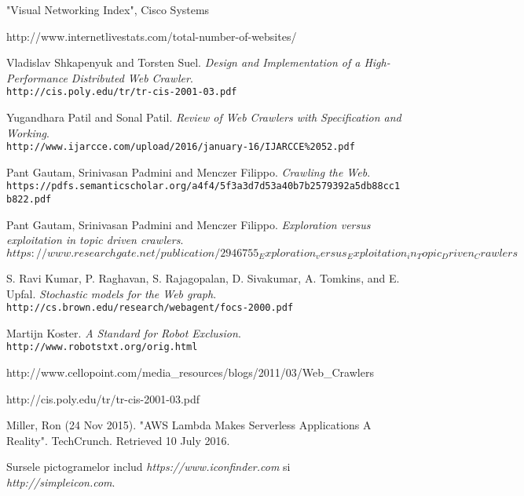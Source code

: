 \begin{thebibliography}{99}

"Visual Networking Index", Cisco Systems
  
http://www.internetlivestats.com/total-number-of-websites/

Vladislav Shkapenyuk and Torsten Suel.
\textit{Design and Implementation of a High-Performance Distributed Web Crawler}.\\
\texttt{http://cis.poly.edu/tr/tr-cis-2001-03.pdf}

Yugandhara Patil and Sonal Patil.
\textit{Review of Web Crawlers with Specification and Working}.\\
\texttt{http://www.ijarcce.com/upload/2016/january-16/IJARCCE\%2052.pdf}

Pant Gautam, Srinivasan Padmini and Menczer Filippo.
\textit{Crawling the Web}.\\
\texttt{https://pdfs.semanticscholar.org/a4f4/5f3a3d7d53a40b7b2579392a5db88cc1b822.pdf}

Pant Gautam, Srinivasan Padmini and Menczer Filippo.
\textit{Exploration versus exploitation in topic driven crawlers}.\\
\texttt{$https://www.researchgate.net/publication/2946755_Exploration_versus_Exploitation_in_Topic_Driven_Crawlers$}

S. Ravi Kumar, P. Raghavan, S. Rajagopalan, D. Sivakumar, A. Tomkins, and E. Upfal.
\textit{Stochastic models for the Web graph}.\\
\texttt{http://cs.brown.edu/research/webagent/focs-2000.pdf}

Martijn Koster.
\textit{A Standard for Robot Exclusion}.\\
\texttt{http://www.robotstxt.org/orig.html}
  
http://www.cellopoint.com/media\_resources/blogs/2011/03/Web\_Crawlers

http://cis.poly.edu/tr/tr-cis-2001-03.pdf

Miller, Ron (24 Nov 2015). "AWS Lambda Makes Serverless Applications A Reality". TechCrunch. Retrieved 10 July 2016.

Sursele pictogramelor includ \emph{https://www.iconfinder.com} si \emph{http://simpleicon.com}.


\end{thebibliography}

